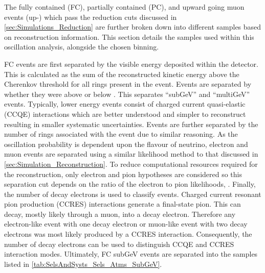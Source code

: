 The fully contained (FC), partially contained (PC), and upward going muon events (up-\quickmath{\mu}) which pass the reduction cuts discussed in \autoref{sec:Simulations_Reduction} are further broken down into different samples based on reconstruction information. This section details the samples used within this oscillation analysis, alongside the chosen binning.

FC events are first separated by the visible energy deposited within the detector. This is calculated as the sum of the reconstructed kinetic energy above the Cherenkov threshold for all rings present in the event. Events are separated by whether they were above or below . This separates ``subGeV'' and ``multiGeV'' events. Typically, lower energy events consist of charged current quasi-elastic (CCQE) interactions which are better understood and simpler to reconstruct resulting in smaller systematic uncertainties. Events are further separated by the number of rings associated with the event due to similar reasoning. As the oscillation probability is dependent upon the flavour of neutrino, electron and muon events are separated using a similar likelihood method to that discussed in \autoref{sec:Simulation_Reconstruction}. To reduce computational resources required for the reconstruction, only electron and pion hypotheses are considered so this separation cut depends on the ratio of the electron to pion likelihoods, . Finally, the number of decay electrons is used to classify events. Charged current resonant pion production (CCRES) interactions generate a final-state pion. This can decay, mostly likely through a muon, into a decay electron. Therefore any electron-like event with one decay electron or muon-like event with two decay electrons was most likely produced by a CCRES interaction. Consequently, the number of decay electrons can be used to distinguish CCQE and CCRES interaction modes. Ultimately, FC subGeV events are separated into the samples listed in \autoref{tab:SelsAndSysts_Sels_Atms_SubGeV}.

